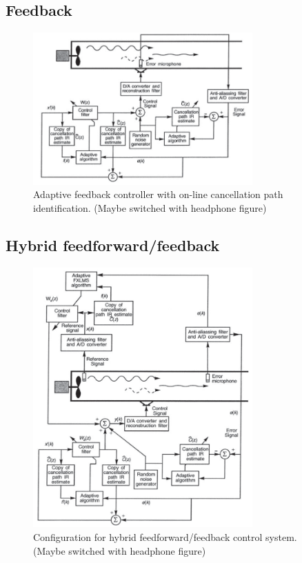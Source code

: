 \subsection*{Feedback}

\begin{figure}[H]
	\centering
	\includegraphics[width=0.75\textwidth]{figures/BasicSystem/feedback}
	\caption{Adaptive feedback controller with on-line cancellation path identification. (Maybe switched with headphone figure)}
	\label{fig:feedbackTopology}
\end{figure}

\subsection*{Hybrid feedforward/feedback}    

\begin{figure}[H]
	\centering
	\includegraphics[width=0.75\textwidth]{figures/BasicSystem/hybrid}
	\caption{Configuration for hybrid feedforward/feedback control system. (Maybe switched with headphone figure)}
	\label{fig:hybridTopology}
\end{figure}

